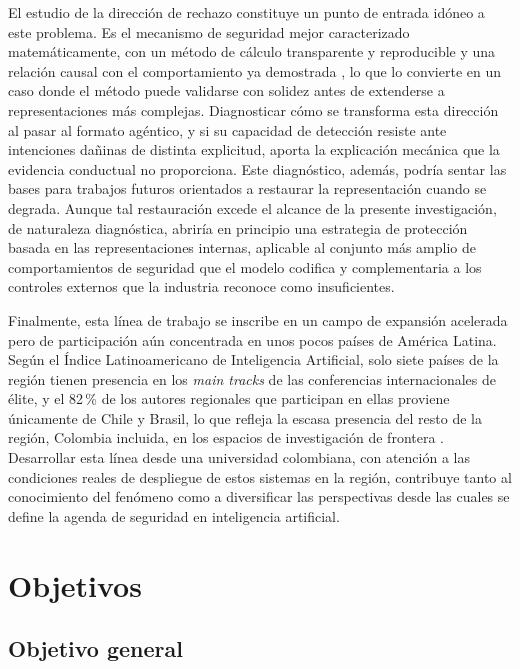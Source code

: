El estudio de la dirección de rechazo constituye un punto de entrada idóneo a este problema. Es el mecanismo de seguridad mejor caracterizado matemáticamente, con un método de cálculo transparente y reproducible y una relación causal con el comportamiento ya demostrada \parencite{arditi2024}, lo que lo convierte en un caso donde el método puede validarse con solidez antes de extenderse a representaciones más complejas. Diagnosticar cómo se transforma esta dirección al pasar al formato agéntico, y si su capacidad de detección resiste ante intenciones dañinas de distinta explicitud, aporta la explicación mecánica que la evidencia conductual no proporciona. Este diagnóstico, además, podría sentar las bases para trabajos futuros orientados a restaurar la representación cuando se degrada. Aunque tal restauración excede el alcance de la presente investigación, de naturaleza diagnóstica, abriría en principio una estrategia de protección basada en las representaciones internas, aplicable al conjunto más amplio de comportamientos de seguridad que el modelo codifica y complementaria a los controles externos que la industria reconoce como insuficientes.

Finalmente, esta línea de trabajo se inscribe en un campo de expansión acelerada pero de participación aún concentrada en unos pocos países de América Latina. Según el Índice Latinoamericano de Inteligencia Artificial, solo siete países de la región tienen presencia en los \textit{main tracks} de las conferencias internacionales de élite, y el 82\,\% de los autores regionales que participan en ellas proviene únicamente de Chile y Brasil, lo que refleja la escasa presencia del resto de la región, Colombia incluida, en los espacios de investigación de frontera \parencite{ilia2025}. Desarrollar esta línea desde una universidad colombiana, con atención a las condiciones reales de despliegue de estos sistemas en la región, contribuye tanto al conocimiento del fenómeno como a diversificar las perspectivas desde las cuales se define la agenda de seguridad en inteligencia artificial.

\section{Objetivos}
\label{sec:objetivos}

\subsection{Objetivo general}

